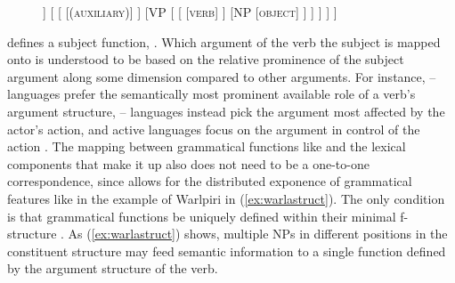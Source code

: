 \begin{figure}
\ex\label{ex:basicsvo2}
\begin{forest}
[IP
	[NP
		[\textsc{subject}]
	]
	[
		[
			[\textsc{(auxiliary)}]
		]
		[VP
			[
				[
					[\textsc{verb}]
				]
				[NP
					[\textsc{object}]
				]
			]
		]
	]
]
\end{forest}
\xe
\end{figure}

\Lfg{} defines a subject function, \Subj{}. Which argument of the verb the
subject is mapped onto is understood to be based on the relative prominence of
the subject argument along some dimension compared to other arguments. For
instance, \Nom{}--\Acc{} languages prefer the semantically most prominent
available role of a verb's argument structure, \Erg{}--\Abs{} languages instead
pick the argument most affected by the actor's action, and active languages
focus on the argument in control of the action \citep[95--96]{bresnan2016}. The
mapping between grammatical functions like \Subj{} and the lexical components
that make it up also does not need to be a one-to-one correspondence, since
\Lfg{} allows for the distributed exponence of grammatical features like in the
example of Warlpiri in (\ref{ex:warlastruct}). The only condition is that
grammatical functions be uniquely defined within their minimal f-structure
\citep[45]{bresnan2016}. As (\ref{ex:warlastruct}) shows, multiple NPs in
different positions in the constituent structure may feed semantic information
to a single function defined by the argument structure of the verb.

